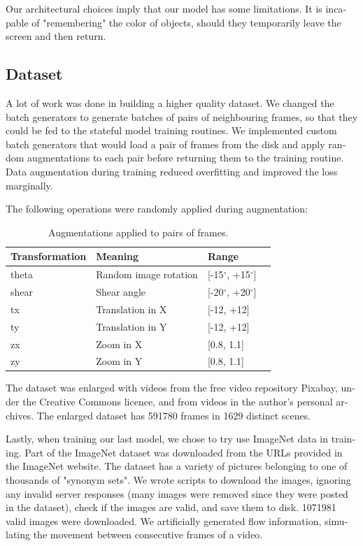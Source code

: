\documentclass[12pt,openright,oneside,a4paper,english]{abntex2}
\begin{document}
\begin{otherlanguage}{english}
Our architectural choices imply that our model has some limitations. It is incapable of "remembering" the color of objects, should they temporarily leave the screen and then return.

\subsection{Dataset}

A lot of work was done in building a higher quality dataset. We changed the batch generators to generate batches of pairs of neighbouring frames, so that they could be fed to the stateful model training routines. We implemented custom batch generators that would load a pair of frames from the disk and apply random augmentations to each pair before returning them to the training routine. Data augmentation during training reduced overfitting and improved the loss marginally.

The following operations were randomly applied during augmentation:

\begin{table}[H]
    \centering
    \begin{tabular}{llll}
    Transformation & Meaning               & Range          &  \\ \hline
    theta          & Random image rotation & [-15$^{\circ}$, +15$^{\circ}$]   &  \\
    shear          & Shear angle           & [-20$^{\circ}$, +20$^{\circ}$] &  \\ \hline
    tx             & Translation in X      & [-12, +12]       &  \\
    ty             & Translation in Y      & [-12, +12]       &  \\ \hline
    zx             & Zoom in X             & [0.8, 1.1]       &  \\
    zy             & Zoom in Y             & [0.8, 1.1]       &  \\ \hline
    \end{tabular}
    \label{table:augmentations}
    \caption{Augmentations applied to pairs of frames.}
\end{table}

The dataset was enlarged with videos from the free video repository Pixabay, under the Creative Commons licence, and from videos in the author's personal archives. The enlarged dataset has 591780 frames in 1629 distinct scenes.

Lastly, when training our last model, we chose to try use ImageNet \cite{imagenet_cvpr09} data in training. Part of the ImageNet dataset was downloaded from the URLs provided in the ImageNet website. The dataset has a variety of pictures belonging to one of thousands of "synonym sets". We wrote scripts to download the images, ignoring any invalid server responses (many images were removed since they were posted in the dataset), check if the images are valid, and save them to disk. 1071981 valid images were downloaded.  We artificially generated flow information, simulating the movement between consecutive frames of a video.


\end{otherlanguage}
\end{document}

